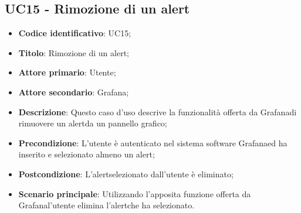 \subsection{UC15 - Rimozione di un alert}
\begin{itemize}
	\item \textbf{Codice identificativo}: UC15;
	\item \textbf{Titolo}: Rimozione di un alert\glo;
	\item \textbf{Attore primario}: Utente;
	\item \textbf{Attore secondario}: Grafana\glo;
	\item \textbf{Descrizione}: Questo caso d'uso descrive la funzionalità offerta da Grafana\glosp di rimuovere un alert\glosp da un pannello grafico;
	\item \textbf{Precondizione}: L'utente è autenticato nel sistema software Grafana\glosp ed ha inserito e selezionato almeno un alert\glo;
	\item \textbf{Postcondizione}: L'alert\glosp selezionato dall'utente è eliminato;
	\item \textbf{Scenario principale}: Utilizzando l'apposita funzione offerta da Grafana\glosp l'utente elimina l'alert\glosp che ha selezionato.
\end{itemize} 
